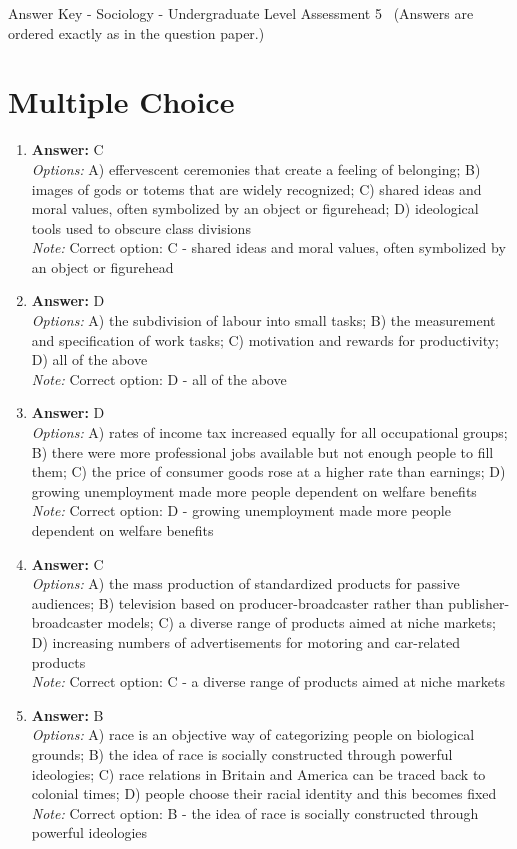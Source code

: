 \documentclass[12pt]{article}
\begin{document}
\begin{center}
Answer Key - Sociology - Undergraduate Level Assessment 5 \
\small (Answers are ordered exactly as in the question paper.)
\end{center}

\section*{Multiple Choice}
\begin{enumerate}[label=\arabic*.]
\item \textbf{Answer:} C
\\ \textit{Options:} A) effervescent ceremonies that create a feeling of belonging; B) images of gods or totems that are widely recognized; C) shared ideas and moral values, often symbolized by an object or figurehead; D) ideological tools used to obscure class divisions
\\ \textit{Note:} Correct option: C - shared ideas and moral values, often symbolized by an object or figurehead
\item \textbf{Answer:} D
\\ \textit{Options:} A) the subdivision of labour into small tasks; B) the measurement and specification of work tasks; C) motivation and rewards for productivity; D) all of the above
\\ \textit{Note:} Correct option: D - all of the above
\item \textbf{Answer:} D
\\ \textit{Options:} A) rates of income tax increased equally for all occupational groups; B) there were more professional jobs available but not enough people to fill them; C) the price of consumer goods rose at a higher rate than earnings; D) growing unemployment made more people dependent on welfare benefits
\\ \textit{Note:} Correct option: D - growing unemployment made more people dependent on welfare benefits
\item \textbf{Answer:} C
\\ \textit{Options:} A) the mass production of standardized products for passive audiences; B) television based on producer-broadcaster rather than publisher-broadcaster models; C) a diverse range of products aimed at niche markets; D) increasing numbers of advertisements for motoring and car-related products
\\ \textit{Note:} Correct option: C - a diverse range of products aimed at niche markets
\item \textbf{Answer:} B
\\ \textit{Options:} A) race is an objective way of categorizing people on biological grounds; B) the idea of race is socially constructed through powerful ideologies; C) race relations in Britain and America can be traced back to colonial times; D) people choose their racial identity and this becomes fixed
\\ \textit{Note:} Correct option: B - the idea of race is socially constructed through powerful ideologies
\end{enumerate}
\end{document}
